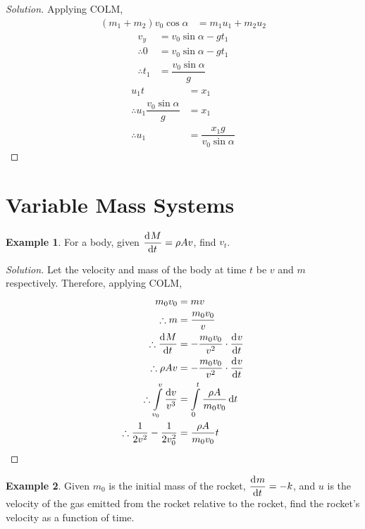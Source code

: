 \documentclass[fleqn, a4paper, 12pt]{article}
\theoremstyle{definition}
\newtheorem{example}{Example}
\theoremstyle{theorem}
\newenvironment{solution}
{\begin{proof}[Solution]\let\qed\relax}
	{\end{proof}}
\begin{document}
\begin{solution}
	Applying COLM,
	\begin{align*}
		(m_1 + m_2) v_0 \cos \alpha &= m_1 u_1 + m_2 u_2
	\end{align*}
	\begin{align*}
		v_y &= v_0 \sin \alpha - g t_1\\
		\therefore 0 &= v_0 \sin \alpha - g t_1\\
		\therefore t_1 &= \dfrac{v_0 \sin \alpha}{g}
	\end{align*}
	\begin{align*}
		u_1 t &= x_1\\
		\therefore u_1 \dfrac{v_0 \sin \alpha}{g} &= x_1\\
		\therefore u_1 &= \dfrac{x_1 g}{v_0 \sin \alpha}
	\end{align*}
\end{solution}

\section{Variable Mass Systems}

\begin{example}
	For a body, given $\dod{M}{t} = \rho A v$, find $v_t$.
\end{example}

\begin{solution}
	Let the velocity and mass of the body at time $t$ be $v$ and $m$ respectively. Therefore, applying COLM,
	\begin{align*}
		m_0 v_0 &= m v\\
		\therefore m &= \dfrac{m_0 v_0}{v}\\
		\therefore \dod{M}{t} &= - \dfrac{m_0 v_0}{v^2} \cdot \dod{v}{t}\\
		\therefore \rho A v &= - \dfrac{m_0 v_0}{v^2} \cdot \dod{v}{t}\\
		\therefore \int\limits_{v_0}^{v} \dfrac{\dif v}{v^3} &= \int\limits_{0}^{t} \dfrac{\rho A}{m_0 v_0} \dif t\\
		\therefore \dfrac{1}{2 v^2} - \dfrac{1}{2 v_0^2} &= \dfrac{\rho A}{m_0 v_0} t 
	\end{align*}
\end{solution}

\begin{example}
	Given $m_0$ is the initial mass of the rocket, $\dod{m}{t} = -k$, and $u$ is the velocity of the gas emitted from the rocket relative to the rocket, find the rocket's velocity as a function of time.
\end{example}
\end{document}
